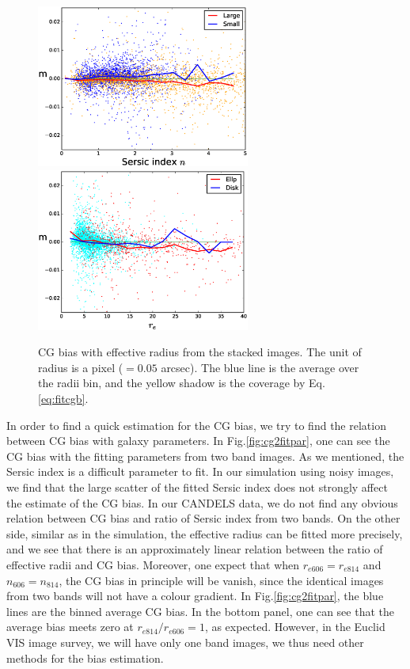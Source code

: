 \documentclass[useAMS,usenatbib]{mn2e}
\begin{document}
\begin{figure}
\includegraphics[width=7.0cm]{z2s-ne17.eps}
\includegraphics[width=7.0cm]{z2s-re17.eps}
\caption{CG bias with effective radius from the stacked images. The
  unit of radius is a pixel ($=0.05$ arcsec). The blue line is the
  average over the radii bin, and the yellow shadow is the coverage
  by Eq.\ref{eq:fitcgb}.}
\label{fig:cg2re}
\end{figure}
%
In order to find a quick estimation for the CG bias, we try to find
the relation between CG bias with galaxy parameters. In
Fig.\ref{fig:cg2fitpar}, one can see the CG bias with the fitting
parameters from two band images. As we mentioned, the Sersic index is
a difficult parameter to fit. In our simulation using
noisy images, we find that the large scatter of the fitted Sersic
index does not strongly affect the estimate of the CG bias. In our 
CANDELS data, we do not find any obvious relation between CG
bias and ratio of Sersic index from two bands. On the other side, similar as in the
simulation, the effective radius can be fitted more precisely, and we
see that there is an approximately linear relation between the ratio
of effective radii and CG bias.  Moreover, one expect that when
$r_{e606}=r_{e814}$ and $n_{606}=n_{814}$, the CG bias in principle
will be vanish, since the identical images from two bands will not
have a colour gradient. In Fig.\ref{fig:cg2fitpar}, the blue lines are
the binned average CG bias. In the bottom panel, one can see that the
average bias meets zero at $r_{e814}/r_{e606}=1$, as
expected. However, in the Euclid VIS image survey, we will have only
one band images, we thus need other methods for the bias estimation.
\end{document}
